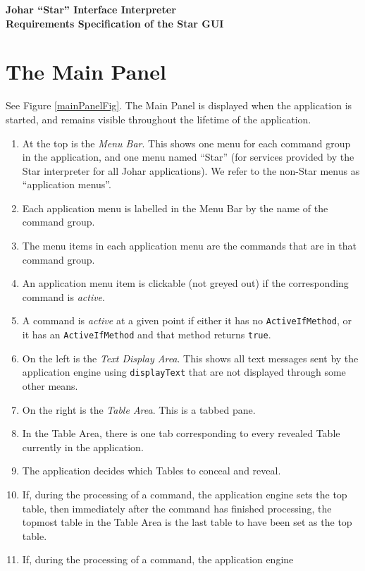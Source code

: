 \documentclass[11pt]{article}
\begin{document}
\begin{center} \bf \Large
Johar ``Star'' Interface Interpreter \\
Requirements Specification of the Star GUI
\end{center}

\section{The Main Panel}

See Figure \ref{mainPanelFig}.  The Main Panel is displayed when the
application is started, and remains visible throughout the lifetime of the
application.
\begin{enumerate}
\item At the top is the {\it Menu Bar}.  This shows one menu
  for each command group in the application, and one menu named
  ``Star'' (for services provided by the Star interpreter for all
  Johar applications).  We refer to the non-Star menus as ``application
  menus''.
\item Each application menu is labelled in the Menu Bar by the name of the
  command group.
\item The menu items in each application menu are the commands that are in
  that command group.
\item An application menu item is clickable (not greyed out) if the corresponding
  command is {\it active}.
\item A command is {\it active} at a given point if either it has no
  {\tt ActiveIfMethod}, or it has an {\tt ActiveIfMethod} and that
  method returns {\tt true}.
\item On the left is the {\it Text Display Area}.  This shows all
  text messages sent by the application engine using {\tt displayText}
  that are not displayed through some other means.
\item On the right is the {\it Table Area}.  This is a tabbed pane.
\item In the Table Area, there is one tab corresponding to every
  revealed Table currently in the application.
\item The application decides which Tables to conceal and reveal.
\item If, during the processing of a command, the application engine sets
  the top table, then immediately after the command has finished
  processing, the topmost table in the Table Area is the last table to
  have been set as the top table.
\item If, during the processing of a command, the application engine

\end{enumerate}
\end{document}
